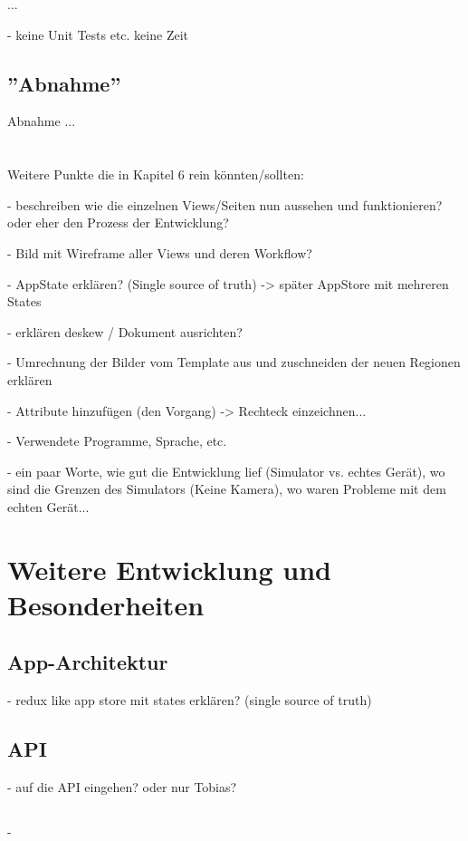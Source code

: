 \documentclass[nomenclature, onesided, 150]{HSMW-Thesis}
\begin{document}
		...
		
		- keine Unit Tests etc. keine Zeit
		
	\section{''Abnahme''}	
		Abnahme ... \\ \\ \\
	
	
	Weitere Punkte die in Kapitel 6 rein könnten/sollten: 
	
	- beschreiben wie die einzelnen Views/Seiten nun aussehen und funktionieren? oder eher den Prozess der Entwicklung?
	
	- Bild mit Wireframe aller Views und deren Workflow?
	
	- AppState erklären? (Single source of truth) -> später AppStore mit mehreren States
	
	- erklären deskew / Dokument ausrichten?
	
	- Umrechnung der Bilder vom Template aus und zuschneiden der neuen Regionen erklären
	
	- Attribute hinzufügen (den Vorgang) -> Rechteck einzeichnen...
	
	- Verwendete Programme, Sprache, etc. 
	
	- ein paar Worte, wie gut die Entwicklung lief (Simulator vs. echtes Gerät), wo sind die Grenzen des Simulators (Keine Kamera), wo waren Probleme mit dem echten Gerät...


\chapter{Weitere Entwicklung und Besonderheiten}

	\section{App-Architektur}
		- redux like app store mit states erklären? (single source of truth)
	
	\section{API}
		- auf die API eingehen? oder nur Tobias?
	
	\section{}
		- 
\end{document}
